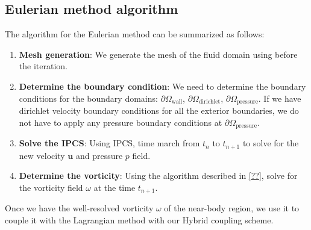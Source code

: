 \subsection*{Eulerian method algorithm}

The algorithm for the Eulerian method can be summarized as follows:

	\begin{enumerate}
	\item \textbf{Mesh generation}: We generate the mesh of the fluid domain using \gmsh before the iteration.
	\item \textbf{Determine the boundary condition}: We need to determine the boundary conditions for the boundary domains: $\partial \Omega_{\mathrm{wall}}$, $\partial \Omega_{\mathrm{dirichlet}}$, $\partial \Omega_{\mathrm{pressure}}$. If we have dirichlet velocity boundary conditions for all the exterior boundaries, we do not have to apply any pressure boundary conditions at $\partial \Omega_{\mathrm{pressure}}$.
	\item \textbf{Solve the IPCS}: Using IPCS, time march from $t_n$ to $t_{n+1}$ to solve for the new velocity $\mathbf{u}$ and pressure $p$ field.
	\item \textbf{Determine the vorticity}: Using the algorithm described in \ref{??}, solve for the vorticity field $\omega$ at the time $t_{n+1}$. 
	\end{enumerate}

Once we have the well-resolved vorticity $\omega$ of the near-body region, we use it to couple it with the Lagrangian method with our Hybrid coupling scheme.
